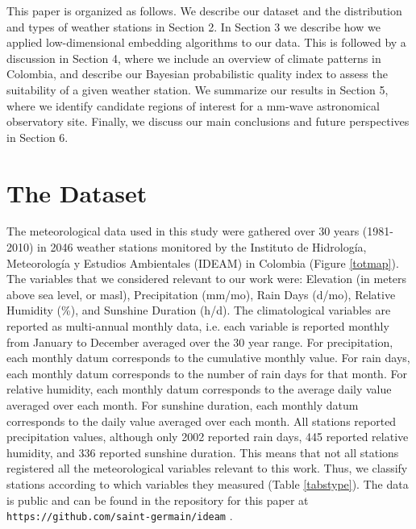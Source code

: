 \documentclass[a4paper,fleqn,usenatbib]{mnras}
\begin{document}
This paper is organized as follows. We describe our dataset and the distribution and types of weather stations in Section 2. In Section 3 we describe how we applied low-dimensional embedding algorithms to our data. This is followed by a discussion in Section 4, where we include an overview of climate patterns in Colombia, and describe our Bayesian probabilistic quality index to assess the suitability of a given weather station. We summarize our results in Section 5, where we identify candidate regions of interest for a mm-wave astronomical observatory site. Finally, we discuss our main conclusions and future perspectives in Section 6.
  
  
\section{The Dataset}

The meteorological data used in this study were gathered over 30 years (1981-2010) in 2046 weather stations monitored by the Instituto de Hidrolog\'ia, Meteorolog\'ia y Estudios Ambientales (IDEAM) in Colombia (Figure \ref{totmap}). The  variables that we considered relevant to our work were: Elevation (in meters above sea level, or masl), Precipitation (mm/mo), Rain Days (d/mo),  Relative Humidity (\%), and Sunshine Duration (h/d). The climatological variables are reported as multi-annual monthly data, i.e. each variable is reported monthly from January to December averaged over the 30 year range. For precipitation, each monthly datum corresponds to the cumulative monthly value.  For rain days, each monthly datum corresponds to the number of rain days for that month.  For relative humidity, each monthly datum corresponds to the  average daily value averaged over each month. For sunshine duration, each monthly datum corresponds to the daily value averaged over each month. All stations reported precipitation values, although only 2002 reported rain days, 445 reported relative humidity, and 336 reported sunshine duration. This means that not all stations registered all the meteorological variables relevant to this work. Thus, we classify stations according to which variables they measured (Table \ref{tabstype}). The data is public and can be found in the repository for this paper at \texttt{https://github.com/saint-germain/ideam} .\\
\end{document}
